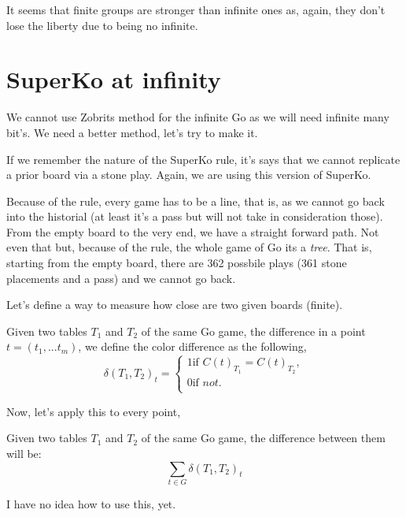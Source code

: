 It seems that finite groups are stronger than infinite ones as, again, they don't lose the liberty due to being no infinite.

\section{SuperKo at infinity}

We cannot use Zobrits method for the infinite Go as we will need infinite many bit's. 
We need a better method, let's try to make it.

If we remember the nature of the SuperKo rule, it's says that we cannot replicate a prior board via a stone play. Again, we are using this version of SuperKo.

Because of the rule, every game has to be a line, that is, as we cannot go back into the historial (at least it's a pass but will not take in consideration those). From the empty board to the very end, we have a straight forward path. Not even that but, because of the rule, the whole game of Go its a \textit{tree}. That is, starting from the empty board, there are 362 possbile plays (361 stone placements and a pass) and we cannot go back.

Let's define a way to measure how close are two given boards (finite).
\begin{definition}
	Given two tables $T_1$ and $T_2$ of the same Go game, the difference in a point $t=(t_1,...t_m)$, we define the color difference as the following,
	\[ 
	\delta(T_1,T_2)_t=
	\begin{cases}
		1 \text{if }C(t)_{T_1}=C(t)_{T_2}, \\
		0 \text{if } not. \\
	\end{cases}
	\]
\end{definition}
Now, let's apply this to every point,
\begin{definition}
	Given two tables $T_1$ and $T_2$ of the same Go game, the difference between them will be:
	$$\sum_{t\in G} \delta(T_1,T_2)_{t}$$
\end{definition}
I have no idea how to use this, yet.